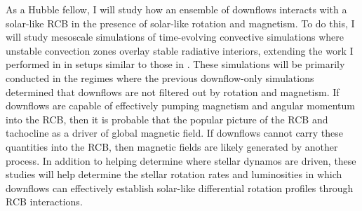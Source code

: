 \documentclass[preprint, hmargin=1in, vmargin=1in]{aastex62}
\begin{document}
%

As a Hubble fellow, I will study how an ensemble of downflows interacts with a solar-like RCB in the presence of solar-like rotation and magnetism.
To do this, I will study mesoscale simulations of time-evolving convective simulations where unstable convection zones overlay stable radiative interiors, extending the work I performed in \citep{anders&brown2017, anders&all2019} in setups similar to those in \citep{kapyla&all2017}. 
These simulations will be primarily conducted in the regimes where the previous downflow-only simulations determined that downflows are not filtered out by rotation and magnetism.
If downflows are capable of effectively pumping magnetism and angular momentum into the RCB, then it is probable that the popular picture of the RCB and tachocline as a driver of global magnetic field.
If downflows cannot carry these quantities into the RCB, then magnetic fields are likely generated by another process.
In addition to helping determine where stellar dynamos are driven, these studies will help determine the stellar rotation rates and luminosities in which downflows can effectively establish solar-like differential rotation profiles through RCB interactions.
\end{document}
